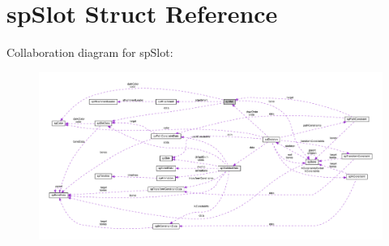 \hypertarget{structspSlot}{}\section{sp\+Slot Struct Reference}
\label{structspSlot}


Collaboration diagram for sp\+Slot\+:
\nopagebreak
\begin{figure}[H]
\begin{center}
\leavevmode
\includegraphics[width=350pt]{structspSlot__coll__graph}
\end{center}
\end{figure}

